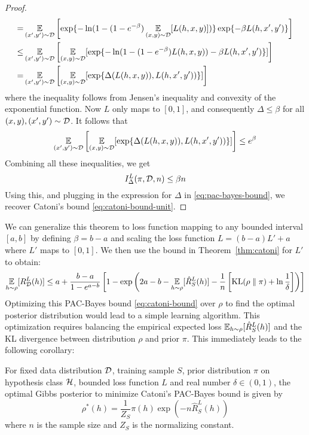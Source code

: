\begin{proof}
\begin{equation}
\begin{split}
      =& \operatorname*{\mathbb{E}}_{(x', y') \sim \mathcal{D}}\left[\exp\{- \ln(1 - (1 - e^{-\beta}) \operatorname*{\mathbb{E}}_{(x,
      y) \sim \mathcal{D}}[L(h, x, y)])\} \exp\{-\beta L(h, x', y')\}\right] \\
      \leq& \operatorname*{\mathbb{E}}_{(x', y') \sim \mathcal{D}}\left[\operatorname*{\mathbb{E}}_{(x, y) \sim \mathcal{D}}[\exp\{- \ln(1 -
      (1 - e^{-\beta}) L(h, x, y)) - \beta L(h, x', y')\}]\right] \\
      =& \operatorname*{\mathbb{E}}_{(x', y') \sim \mathcal{D}}\left[\operatorname*{\mathbb{E}}_{(x, y) \sim \mathcal{D}}[\exp\{\Delta(L(h, x,
      y)), L(h, x', y'))\}]\right]
    \end{split}
  \end{equation}
  where the inequality follows from Jensen's inequality and convexity of the
  exponential function. Now $L$ only maps to $[0, 1]$, and consequently $\Delta
  \leq \beta$ for all $(x, y), (x', y') \sim \mathcal{D}$. It follows that
  \begin{equation}
      \operatorname*{\mathbb{E}}_{(x', y') \sim \mathcal{D}}\left[\operatorname*{\mathbb{E}}_{(x, y) \sim \mathcal{D}}[\exp\{\Delta(L(h, x,
      y)), L(h, x', y'))\}]\right] \leq e^\beta
  \end{equation}
  Combining all these inequalities, we get
  \begin{equation}
    I_\Delta^L(\pi, \mathcal{D}, n) \leq \beta n
  \end{equation}
  Using this, and plugging in the expression for $\Delta$ in
  \eqref{eq:pac-bayes-bound}, we recover Catoni's bound
  \eqref{eq:catoni-bound-unit}.
\end{proof}

We can generalize this theorem to loss function mapping to any bounded interval
$[a, b]$ by defining $\beta = b - a$ and scaling the loss function $L = (b - a)
L' + a$ where $L'$ maps to $[0, 1]$. We then use the bound in
Theorem~\ref{thm:catoni} for $L'$ to obtain:
\begin{equation}
  \label{eq:catoni-bound}
  \operatorname*{\mathbb{E}}_{h \sim \rho}[R_{\mathcal{D}}^L(h)] \leq a + \frac{b - a}{1 - e^{a - b}} \left[1 -
  \exp\left(2 a - b - \operatorname*{\mathbb{E}}_{h \sim \rho}[\hat{R}_S^L(h)] - \frac{1}{n}
  \left[\text{KL}(\rho \parallel \pi) + \ln \frac{1}{\delta}\right]\right)\right]
\end{equation}
Optimizing this PAC-Bayes bound \eqref{eq:catoni-bound} over $\rho$ to find
the optimal posterior distribution would lead to a simple learning algorithm.
This optimization requires balancing the empirical expected loss $\operatorname*{\mathbb{E}}_{h \sim
\rho}[\hat{R}_S^L(h)]$ and the KL divergence between distribution $\rho$ and
prior $\pi$. This immediately leads to the following corollary:

\begin{corollary}
  \label{cor:gibbs}
  For fixed data distribution $\mathcal{D}$, training sample $S$, prior distribution
  $\pi$ on hypothesis class $\mathcal{H}$, bounded loss function $L$ and real number
  $\delta \in (0, 1)$, the optimal Gibbs posterior to minimize Catoni's
  PAC-Bayes bound is given by
  \begin{equation}
    \rho^*(h) = \frac{1}{Z_S} \pi(h) \exp(-n \hat{R}_S^L(h))
  \end{equation}
  where $n$ is the sample size and $Z_S$ is the normalizing constant.
\end{corollary}

